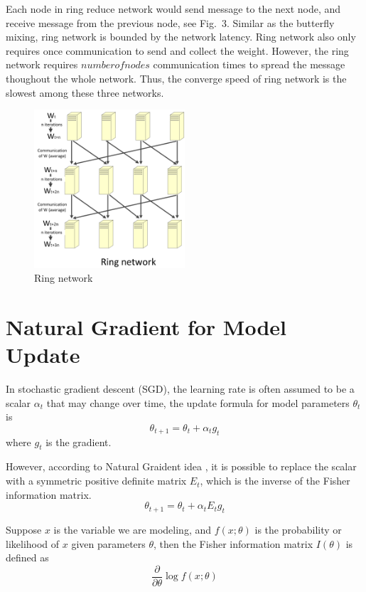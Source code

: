 \documentclass{article}
\begin{document}
Each node in ring reduce network would send message to the next node, and receive message from the previous node, see Fig.~3. Similar as the butterfly mixing, ring network is bounded by the network latency. Ring network also only requires once communication to send and collect the weight. However, the ring network requires $number of nodes$ communication times to spread the message thoughout the whole network. Thus, the converge speed of ring network is the slowest among these three networks. 
\begin{figure}[htb]
  \centering
  \includegraphics[width=0.5\textwidth]{ring.jpg}
  \caption{Ring network}
\end{figure}
\section{Natural Gradient for Model Update}
In stochastic gradient descent (SGD), the learning rate is often assumed to be a scalar $\alpha_t$ that may change over time,
the update formula for model parameters $\theta_{t}$ is
\begin{equation}
\theta_{t+1} = \theta_{t} + \alpha_t g_t
\end{equation}
where $g_t$ is the gradient.

However, according to Natural Graident idea \cite{murata1999statistical,roux2008topmoumoute}, it is possible to replace the scalar with a 
symmetric positive definite matrix $E_t$, which is the inverse of the Fisher information matrix.
\begin{equation}
\theta_{t+1} = \theta_{t} + \alpha_t E_t g_t
\end{equation}

Suppose $x$ is the variable we are modeling, and $f(x;\theta)$ is the probability or likelihood of $x$ given parameters $\theta$, then the
Fisher information matrix $I(\theta)$ is defined as
\begin{equation}
\frac{\partial}{\partial\theta}\log f(x;\theta)
\end{equation}
\end{document}
